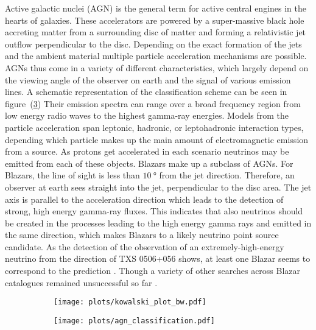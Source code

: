 Active galactic nuclei (AGN) is the general term for active central engines in the hearts of galaxies.
These accelerators are powered by a super-massive black hole accreting matter from a surrounding disc of matter and forming a relativistic jet outflow perpendicular to the disc.
Depending on the exact formation of the jets and the ambient material multiple particle acceleration mechanisms are possible.
AGNs thus come in a variety of different characteristics, which largely depend on the viewing angle of the observer on earth and the signal of various emission lines.
A schematic representation of the classification scheme can be seen in figure~(\ref{fig:astro_agns})
Their emission spectra can range over a broad frequency region from low energy radio waves to the highest gamma-ray energies.
Models from the particle acceleration span leptonic, hadronic, or leptohadronic interaction types, depending which particle makes up the main amount of electromagnetic emission from a source.
As protons get accelerated in each scenario neutrinos may be emitted from each of these objects.
Blazars make up a subclass of AGNs.
For Blazars, the line of sight is less than $\SI{10}{\degree}$ from the jet direction.
Therefore, an observer at earth sees straight into the jet, perpendicular to the disc area.
The jet axis is parallel to the acceleration direction which leads to the detection of strong, high energy gamma-ray fluxes.
This indicates that also neutrinos should be created in the processes leading to the high energy gamma rays and emitted in the same direction, which makes Blazars to a likely neutrino point source candidate.
As the detection of the observation of an extremely-high-energy neutrino from the direction of TXS 0506+056 shows, at least one Blazar seems to correspond to the prediction \cite{Keivani:2018rnh,Gao:2018mnu}.
Though a variety of other searches across Blazar catalogues remained unsuccessful so far \cite{Meagher:2017omt,Huber:2017wxt}.

\begin{figure}[htbp]
  \centering
  \begin{subfigure}[t]{0.49\textwidth}
    \centering
    \texttt{[image: plots/kowalski\_plot\_bw.pdf]}
    \label{fig:astro_kowalski_plot}
  \end{subfigure}
  \hfill
  \begin{subfigure}[t]{0.49\textwidth}
    \centering
    \texttt{[image: plots/agn\_classification.pdf]}
    \label{fig:astro_agns}
  \end{subfigure}
\end{figure}



